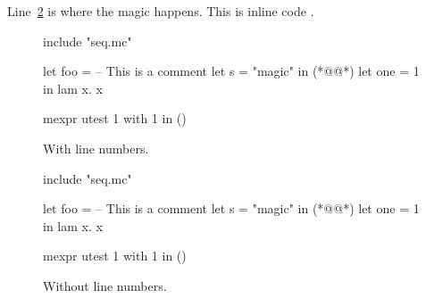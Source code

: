 \documentclass{article}
\begin{document}
Line~\ref{l:magic} is where the magic happens. This is inline code
.

\begin{figure}[h]
  \begin{mcore-lines}
  include "seq.mc"

  let foo =
    -- This is a comment
    let s = "magic" in (*@\label{l:magic}@*)
    let one = 1 in
    lam x. x

  mexpr
    utest 1 with 1 in ()
  \end{mcore-lines}
  \caption{With line numbers.}
\end{figure}

\begin{figure}[h]
  \begin{mcore}
  include "seq.mc"

  let foo =
    -- This is a comment
    let s = "magic" in (*@\label{l:magic}@*)
    let one = 1 in
    lam x. x

  mexpr
    utest 1 with 1 in ()
  \end{mcore}
  \caption{Without line numbers.}
\end{figure}


\end{document}
